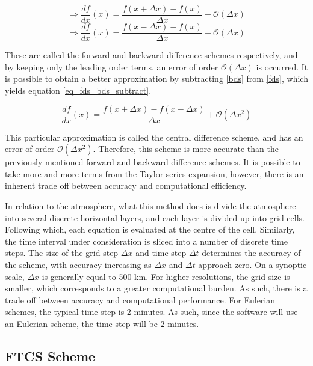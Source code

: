 \begin{equation}
    \Rightarrow \frac{d f}{d x}(x) = \frac{f(x + \Delta x) - f(x)}{\Delta x} + \mathcal{O}(\Delta x)
\end{equation}
\begin{equation}
    \Rightarrow \frac{d f}{d x}(x) = \frac{f(x - \Delta x) - f(x)}{\Delta x} + \mathcal{O}(\Delta x)
\end{equation}

These are called the forward and backward difference schemes respectively, and by keeping only the leading order terms, an error of order $\mathcal{O}(\Delta x)$ is occurred. It is possible to obtain a better approximation by subtracting \ref{bds} from \ref{fds}, which yields equation \ref{eq_fds_bds_subtract}.

\begin{equation}
    \frac{d f}{d x}(x) = \frac{f(x + \Delta x) - f(x - \Delta x)}{\Delta x} + \mathcal{O}(\Delta x^2)
    \label{eq_fds_bds_subtract}
\end{equation}

This particular approximation is called the central difference scheme, and has an error of order $\mathcal{O}(\Delta x^2)$. Therefore, this scheme is more accurate than the previously mentioned forward and backward difference schemes. It is possible to take more and more terms from the Taylor series expansion, however, there is an inherent trade off between accuracy and computational efficiency. 

In relation to the atmosphere, what this method does is divide the atmosphere into several discrete horizontal layers, and each layer is divided up into grid cells. Following which, each equation is evaluated at the centre of the cell. Similarly, the time interval under consideration is sliced into a number of discrete time steps. The size of the grid step $\Delta x$ and time step $\Delta t$ determines the accuracy of the scheme, with accuracy increasing as $\Delta x$ and $\Delta t$ approach zero. On a synoptic scale, $\Delta x$ is generally equal to 500 km. For higher resolutions, the grid-size is smaller, which corresponds to a greater computational burden. As such, there is a trade off between accuracy and computational performance. For Eulerian schemes, the typical time step is 2 minutes. As such, since the software will use an Eulerian scheme, the time step will be 2 minutes\cite{leapfrog_slides_one}.

\subsection{FTCS Scheme}\label{ftcs_section}

